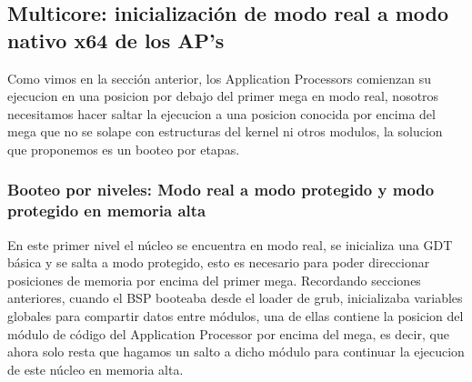 \subsection{Multicore: inicialización de modo real a modo nativo x64 de los AP's}
    Como vimos en la sección anterior, los Application Processors comienzan su ejecucion en una posicion por debajo del primer mega en modo real, nosotros necesitamos hacer saltar la ejecucion a una posicion conocida por encima del mega que no se solape con estructuras del kernel ni otros modulos, la solucion que proponemos es un booteo por etapas.
    
    \subsubsection{Booteo por niveles: Modo real a modo protegido y modo protegido en memoria alta}
    En este primer nivel el núcleo se encuentra en modo real, se inicializa una GDT básica y se salta a modo protegido, esto es necesario para poder direccionar posiciones de memoria por encima del primer mega. Recordando secciones anteriores, cuando el BSP booteaba desde el loader de grub, inicializaba variables globales para compartir datos entre módulos, una de ellas contiene la posicion del módulo de código del Application Processor por encima del mega, es decir, que ahora solo resta que hagamos un salto a dicho módulo para continuar la ejecucion de este núcleo en memoria alta.
